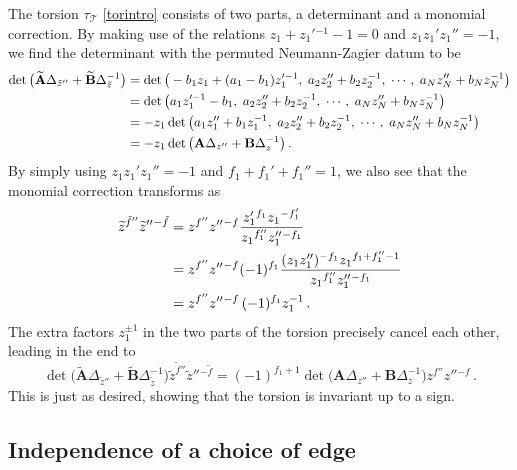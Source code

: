 \documentclass[12pt]{amsart}
\newcommand{\lbl}{\label}
\theoremstyle{definition}
\def\be{  \begin{equation} }
\def\ee{  \end{equation} }
\newcommand{\CT}{\mathcal{T}}
\newcommand{\wt}{\widetilde}
\newcommand{\mb}{\mathbf}
\numberwithin{equation}{section}
\begin{document}
The torsion $\tau_{\CT}$ \eqref{torintro} 
consists of two parts, a determinant and a monomial 
correction. By making use of the relations $z_1+z_1'{}^{-1}-1=0$ and 
$z_1z_1'z_1''=-1$, we find the determinant with the permuted Neumann-Zagier datum to be
%
\begin{align} 
\det\big(\wt {\mb A}\Delta_{\tilde z''}+\wt {\mb B}\Delta_{\tilde z}^{-1}\big) &= 
\det \big( -b_1z_1 +(a_1-b_1)z_1'^{-1},\; a_2 z_2''+b_2 z_2^{-1} ,\;\cdots ,\; 
a_N z_N''+b_N z_N^{-1} \big) \notag\\
 &= \det\big( a_1 z_1'^{-1}-b_1 ,\; a_2 z_2''+b_2 z_2^{-1} ,\;\cdots ,\; 
a_N z_N''+b_N z_N^{-1} \big) \notag\\
 &= -z_1 \det\big( a_1 z_1''+b_1 z_1^{-1} ,\; a_2 z_2''+b_2 z_2^{-1} ,\;
\cdots ,\; a_N z_N''+b_N z_N^{-1} \big) \notag\\
 &= -z_1\det\big(\mb A\Delta_{z''}+\mb B\Delta_{z}^{-1}\big)\,.
\end{align}
%
By simply using $z_1z_1'z_1''=-1$ and $f_1+f_1'+f_1''=1$, we also see that 
the monomial correction transforms as
%
\begin{align} \wt z^{\tilde f''}\wt z''{}^{-\tilde f} &=
 z^{f''}z''{}^{-f} \frac{ z_1'{}^{f_1}z_1{}^{-f_1'} }{z_1{}^{f_1''}z_1''{}^{-f_1}} 
\notag\\
 &= z^{f''}z''{}^{-f} 
(-1)^{f_1}\frac{(z_1z_1'')^{-f_1}z_1{}^{f_1+f_1''-1}}{z_1{}^{f_1''}z_1''{}^{-f_1}} 
\notag \\
 &= z^{f''}z''{}^{-f}\,(-1)^{f_1}z_1^{-1}\,.
\end{align}
%
The extra factors $z_1^{\pm 1}$ in the two parts of the torsion precisely cancel 
each other, leading in the end to
%
\be \det\big(\wt {\mb A}\Delta_{\tilde z''}
+\wt {\mb B}\Delta_{\tilde z}^{-1}\big)\wt z^{\tilde f''}
\wt z''{}^{-\tilde f} = (-1)^{f_1+1}\det\big(\mb A\Delta_{z''}
+\mb B\Delta_{z}^{-1}\big)z^{f''}z''{}^{-f}\,.\ee
%
This is just as desired, showing that the torsion is invariant up to a sign.


\subsection{Independence of a choice of edge}
\lbl{sec.invglue}
\end{document}
